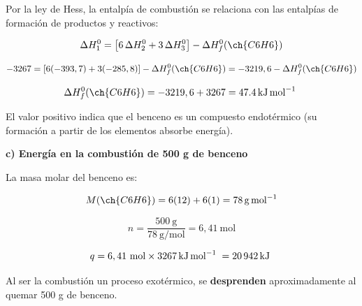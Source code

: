 \begin{exerciseEVAU}
\begin{solu}
        Por la ley de Hess, la entalpía de combustión se relaciona con las entalpías de formación de productos y reactivos:

        \begin{equation*}
            \Delta H^0_1 = \left[ 6\, \Delta H^0_2 + 3\, \Delta H^0_3 \right] - \Delta H^0_f (\ch{C6H6})
        \end{equation*}

        \begin{equation*}
            -3267 = \left[ 6(-393,7) + 3(-285,8) \right] - \Delta H^0_f (\ch{C6H6}) = -3219,6 - \Delta H^0_f (\ch{C6H6})
        \end{equation*}

        \begin{equation*}
            \Delta H^0_f (\ch{C6H6}) = -3219,6 + 3267 = \energia[kjmol]{47.4}
        \end{equation*}

        El valor positivo indica que el benceno es un compuesto endotérmico (su formación a partir de los elementos absorbe energía).

        \textbf{c) Energía en la combustión de 500 g de benceno}

        La masa molar del benceno es:

        \begin{equation*}
            M(\ch{C6H6}) = 6(12) + 6(1) = \SI{78}{\gram\per\mole}
        \end{equation*}

        \begin{equation*}
            n = \dfrac{500 \ \si{\gram}}{78 \ \si{\gram\per\mole}} = 6,41 \ \text{mol}
        \end{equation*}

        \begin{equation*}
            q = 6,41 \ \text{mol} \times \energia[kjmol]{3267} = \energia[kj]{20942}
        \end{equation*}

        Al ser la combustión un proceso exotérmico, se \textbf{desprenden} aproximadamente  al quemar 500 g de benceno.

    \end{solu}
\end{exerciseEVAU}

